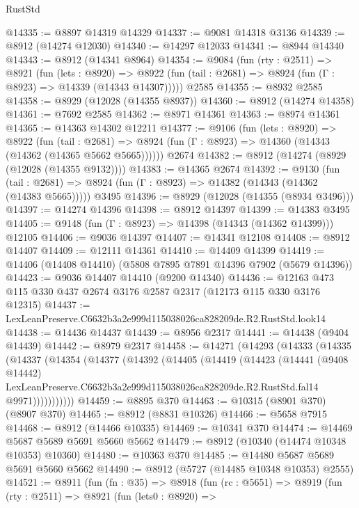 \begin{lexlean}{RustStd}
\begin{coremodule}
@14335 := @8897 @14319 @14329
@14337 := @9081 @14318 @3136
@14339 := @8912 (@14274 @12030)
@14340 := @14297 @12033
@14341 := @8944 @14340
@14343 := @8912 (@14341 @8964)
@14354 := @9084
    (fun (rty : @2511) =>
    @8921
      (fun (lets : @8920) =>
      @8922 (fun (tail : @2681) => @8924 (fun (Γ : @8923) => @14339 (@14343 @14307)))))
    @2585
@14355 := @8932 @2585
@14358 := @8929 (@12028 (@14355 @8937))
@14360 := @8912 (@14274 @14358)
@14361 := @7692 @2585
@14362 := @8971 @14361
@14363 := @8974 @14361
@14365 := @14363 @14302 @12211
@14377 := @9106
    (fun (lets : @8920) =>
    @8922
      (fun (tail : @2681) =>
      @8924 (fun (Γ : @8923) => @14360 (@14343 (@14362 (@14365 @5662 @5665))))))
    @2674
@14382 := @8912 (@14274 (@8929 (@12028 (@14355 @9132))))
@14383 := @14365 @2674
@14392 := @9130
    (fun (tail : @2681) => @8924 (fun (Γ : @8923) => @14382 (@14343 (@14362 (@14383 @5665)))))
    @3495
@14396 := @8929 (@12028 (@14355 (@8934 @3496)))
@14397 := @14274 @14396
@14398 := @8912 @14397
@14399 := @14383 @3495
@14405 := @9148 (fun (Γ : @8923) => @14398 (@14343 (@14362 @14399))) @12105
@14406 := @9036 @14397
@14407 := @14341 @12108
@14408 := @8912 @14407
@14409 := @12111 @14361
@14410 := @14409 @14399
@14419 := @14406 (@14408 @14410) (@5808 @7895 @7891 @14396 @7902 (@5679 @14396))
@14423 := @9036 @14407 @14410 (@9200 @14340)
@14436 := @12163 @473 @115 @330 @437 @2674 @3176 @2587 @2317 (@12173 @115 @330 @3176 @12315)
@14437 := LexLeanPreserve.C6632b3a2e999d115038026ca828209de.R2.RustStd.look14
@14438 := @14436 @14437
@14439 := @8956 @2317
@14441 := @14438 (@9404 @14439)
@14442 := @8979 @2317
@14458 := @14271
    (@14293
      (@14333
        (@14335
          (@14337
            (@14354
              (@14377
                (@14392
                  (@14405
                    (@14419
                      (@14423
                        (@14441
                          (@9408 @14442)
                          LexLeanPreserve.C6632b3a2e999d115038026ca828209de.R2.RustStd.fal14
                          @9971)))))))))))
@14459 := @8895 @370
@14463 := @10315 (@8901 @370) (@8907 @370)
@14465 := @8912 (@8831 @10326)
@14466 := @5658 @7915
@14468 := @8912 (@14466 @10335)
@14469 := @10341 @370
@14474 := @14469 @5687 @5689 @5691 @5660 @5662
@14479 := @8912 (@10340 (@14474 @10348 @10353) @10360)
@14480 := @10363 @370
@14485 := @14480 @5687 @5689 @5691 @5660 @5662
@14490 := @8912 (@5727 (@14485 @10348 @10353) @2555)
@14521 := @8911
    (fun (fn : @35) =>
    @8918
      (fun (rc : @5651) =>
      @8919
        (fun (rty : @2511) =>
        @8921
          (fun (lets0 : @8920) =>

\end{coremodule}
\end{lexlean}
